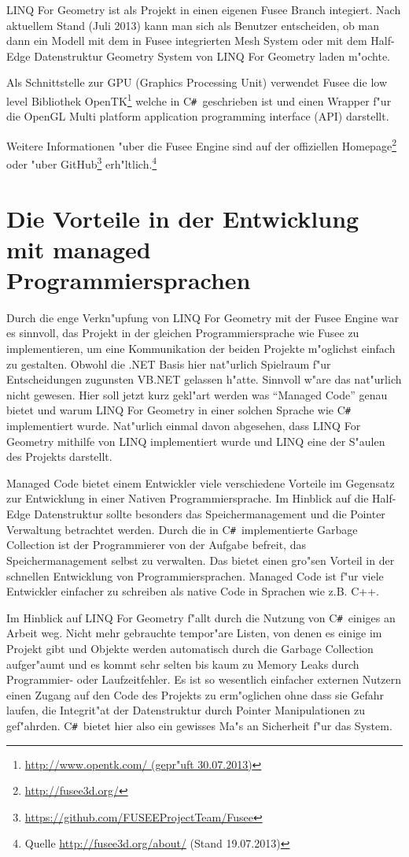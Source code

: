 \documentclass[pagesize, paper=a4, fontsize=12pt,titlepage=true, headings=small, headnosepline, abstractoff, liststotoc, nochapterprefix, plainheadsepline]{scrreprt}
\newcommand{\CSS}{C\texttt{\# }}
\newcommand{\LFGS}{LINQ For Geometry }
\newcommand{\HES}{Half-Edge Datenstruktur }
\begin{document}
\LFGS ist als Projekt in einen eigenen Fusee Branch integiert. Nach aktuellem Stand (Juli 2013) kann man sich als Benutzer entscheiden, ob man dann ein Modell mit dem in Fusee integrierten Mesh System oder mit dem \HES Geometry System von \LFGS laden m"ochte.

Als Schnittstelle zur GPU (Graphics Processing Unit) verwendet Fusee die low level Bibliothek OpenTK\footnote{\url{http://www.opentk.com/ (gepr"uft 30.07.2013)}} welche in \CSS geschrieben ist und einen Wrapper f"ur die OpenGL Multi platform application programming interface (API) darstellt.

Weitere Informationen "uber die Fusee Engine sind auf der offiziellen Homepage\footnote{\url{http://fusee3d.org/}} oder "uber GitHub\footnote{\url{https://github.com/FUSEEProjectTeam/Fusee}} erh"ltlich.\footnote{Quelle \url{http://fusee3d.org/about/} (Stand 19.07.2013)}
\section {Die Vorteile in der Entwicklung mit managed Programmiersprachen}\label{sec:VorteileManaged}
Durch die enge Verkn"upfung von \LFGS mit der Fusee Engine war es sinnvoll, das Projekt in der gleichen Programmiersprache wie Fusee zu implementieren, um eine Kommunikation der beiden Projekte m"oglichst einfach zu gestalten. Obwohl die .NET Basis hier nat"urlich Spielraum f"ur Entscheidungen zugunsten VB.NET gelassen h"atte. Sinnvoll w"are das nat"urlich nicht gewesen. Hier soll jetzt kurz gekl"art werden was "`Managed Code"' genau bietet und warum \LFGS in einer solchen Sprache wie \CSS implementiert wurde. Nat"urlich einmal davon abgesehen, dass \LFGS mithilfe von LINQ implementiert wurde und LINQ eine der S"aulen des Projekts darstellt.

		Managed Code bietet einem Entwickler viele verschiedene Vorteile im Gegensatz zur Entwicklung in einer Nativen Programmiersprache. Im Hinblick auf die \HES sollte besonders das Speichermanagement und die Pointer Verwaltung betrachtet werden. Durch die in \CSS implementierte Garbage Collection ist der Programmierer von der Aufgabe befreit, das Speichermanagement selbst zu verwalten. Das bietet einen gro"sen Vorteil in der schnellen Entwicklung von Programmiersprachen. Managed Code ist f"ur viele Entwickler einfacher zu schreiben als native Code in Sprachen wie z.B. C++.

Im Hinblick auf \LFGS f"allt durch die Nutzung von \CSS einiges an Arbeit weg. Nicht mehr gebrauchte tempor"are Listen, von denen es einige im Projekt gibt und Objekte werden automatisch durch die Garbage Collection aufger"aumt und es kommt sehr selten bis kaum zu Memory Leaks durch Programmier- oder Laufzeitfehler. Es ist so wesentlich einfacher externen Nutzern einen Zugang auf den Code des Projekts zu erm"oglichen ohne dass sie Gefahr laufen, die Integrit"at der Datenstruktur durch Pointer Manipulationen zu gef"ahrden. \CSS bietet hier also ein gewisses Ma"s an Sicherheit f"ur das System.
\end{document}
